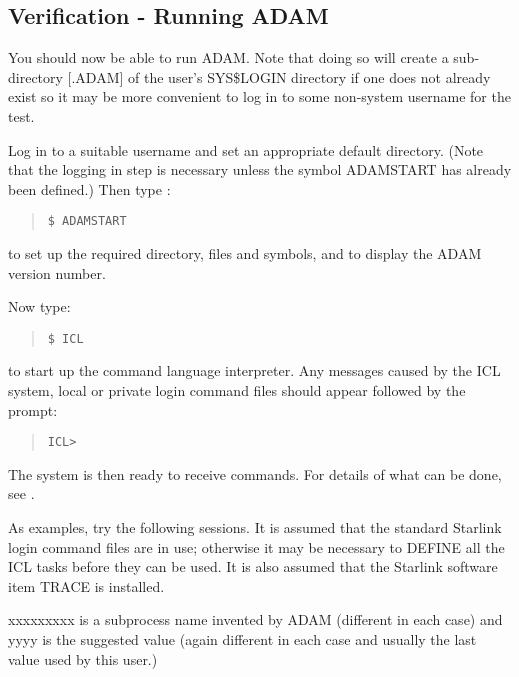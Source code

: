 \subsection{Verification - Running ADAM}
You should now be able to run ADAM.
Note that doing so will create a sub-directory [.ADAM] of the user's
SYS\$LOGIN directory if one does not already exist so it may be more
convenient to log in to some non-system username for the test.

Log in to a suitable username and set an appropriate default directory.
(Note that the logging in step is necessary unless the symbol ADAM\-START
has already been defined.)
Then type :
\small \begin{quote}
\begin{verbatim}
$ ADAMSTART
\end{verbatim}
\end{quote} \normalsize
to set up the required directory, files and symbols, and to display the ADAM 
version number.

Now type:
\small \begin{quote}
\begin{verbatim}
$ ICL
\end{verbatim}
\end{quote} \normalsize
to start up the command language interpreter.
Any messages caused by the ICL system, local or private login command files
should appear followed by the prompt:
\small \begin{quote}
\begin{verbatim}
ICL>
\end{verbatim}
\end{quote} \normalsize
The system is then ready to receive commands. For details of what can be
done, see \cite{icl}.

As examples, try the following sessions. It is assumed that the standard
Starlink login command files are in use; otherwise it may be necessary to
DEFINE all the ICL tasks before they can be used.
It is also assumed that the Starlink software item TRACE is installed.

xxxxxxxxx is a subprocess name invented by ADAM (different in each case) and
yyyy is the suggested value (again different in each case and usually the last 
value used by this user.)

